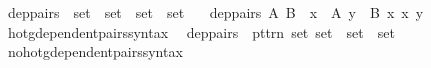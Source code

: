 \begin{isabellebody}
%
\isadelimproof
%
\endisadelimproof
%
\isadelimdocument
%
\endisadelimdocument
%
\isatagdocument
%
\isamarkuptrue%
%
\endisatagdocument
{\isafolddocument}%
%
\isadelimdocument
%
\endisadelimdocument
{}\isamarkupfalse%
\ dep{\isacharunderscore}{\kern0pt}pairs\ {\isacharcolon}{\kern0pt}{\isacharcolon}{\kern0pt}\ {\isacartoucheopen}set\ {\isasymRightarrow}\ {\isacharparenleft}{\kern0pt}set\ {\isasymRightarrow}\ set{\isacharparenright}{\kern0pt}\ {\isasymRightarrow}\ set{\isacartoucheclose}\isanewline
\ \ \ {\isachardoublequoteopen}dep{\isacharunderscore}{\kern0pt}pairs\ A\ B\ {\isasymequiv}\ {\isasymUnion}x\ {\isasymin}\ A{\isachardot}{\kern0pt}\ {\isasymUnion}y\ {\isasymin}\ B\ x{\isachardot}{\kern0pt}\ {\isacharbraceleft}{\kern0pt}{\isasymlangle}x{\isacharcomma}{\kern0pt}\ y{\isasymrangle}{\isacharbraceright}{\kern0pt}{\isachardoublequoteclose}\isanewline
\isanewline
{}\isamarkupfalse%
\ hotg{\isacharunderscore}{\kern0pt}dependent{\isacharunderscore}{\kern0pt}pairs{\isacharunderscore}{\kern0pt}syntax\isanewline
{}\isanewline
{}\isamarkupfalse%
\isanewline
\ \ {\isachardoublequoteopen}{\isacharunderscore}{\kern0pt}dep{\isacharunderscore}{\kern0pt}pairs{\isachardoublequoteclose}\ {\isacharcolon}{\kern0pt}{\isacharcolon}{\kern0pt}\ {\isacartoucheopen}{\isacharbrackleft}{\kern0pt}pttrn{\isacharcomma}{\kern0pt}\ set{\isacharcomma}{\kern0pt}\ set\ {\isasymRightarrow}\ set{\isacharbrackright}{\kern0pt}\ {\isasymRightarrow}\ set{\isacartoucheclose}\ {\isacharparenleft}{\kern0pt}{\isachardoublequoteopen}{\isasymSum}{\isacharunderscore}{\kern0pt}\ {\isasymin}\ {\isacharunderscore}{\kern0pt}{\isachardot}{\kern0pt}{\isacharslash}{\kern0pt}\ {\isacharunderscore}{\kern0pt}{\isachardoublequoteclose}\ {\isacharbrackleft}{\kern0pt}{}{\isacharcomma}{\kern0pt}\ {}{\isacharcomma}{\kern0pt}\ {}{}{}{\isacharbrackright}{\kern0pt}\ {}{}{\isacharparenright}{\kern0pt}\isanewline
{}\isamarkupfalse%
\isanewline
{}\isamarkupfalse%
\ no{\isacharunderscore}{\kern0pt}hotg{\isacharunderscore}{\kern0pt}dependent{\isacharunderscore}{\kern0pt}pairs{\isacharunderscore}{\kern0pt}syntax\isanewline
{}\isanewline
{}\isamarkupfalse%
\isanewline

\end{isabellebody}
